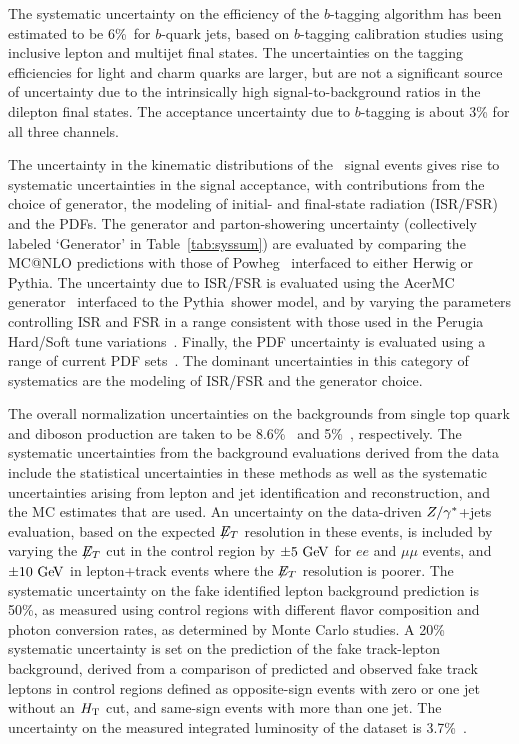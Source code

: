 The systematic uncertainty on the efficiency of the $b$-tagging algorithm has been estimated to be $6$\%\ for $b$-quark jets, based on $b$-tagging calibration studies using inclusive lepton and multijet final states.
The uncertainties on the tagging efficiencies for light and charm quarks are larger, but are not a significant source of uncertainty due to the
intrinsically high signal-to-background ratios in the dilepton final states.
The acceptance uncertainty due to $b$-tagging is about 3\% for all three channels.

The uncertainty in the kinematic distributions of the \ttbar\ signal events
gives rise to systematic uncertainties in
the signal acceptance, with contributions from the choice of generator, the modeling of initial- and final-state
radiation (ISR/FSR) and the PDFs.
The generator and parton-showering uncertainty (collectively labeled
`Generator' in Table~\ref{tab:syssum}) are evaluated by comparing the
{\sc MC@NLO} predictions  with those of
{\sc Powheg}~\cite{powheg,Frixione:2007vw,Alioli:2010xd} interfaced to
either {\sc Herwig} or {\sc Pythia}.
The uncertainty due to ISR/FSR is evaluated using the {\sc AcerMC} generator~\cite{Acer}
interfaced to the {\sc Pythia}\ shower model, and by varying the parameters controlling ISR
and FSR in a range consistent with those used in the Perugia Hard/Soft tune variations~\cite{Skands}.
Finally, the PDF uncertainty is evaluated using a range of
current PDF sets~\cite{Pumplin:2002vw}.
The dominant uncertainties in this category of systematics are the
modeling of ISR/FSR and the generator choice.

The overall normalization uncertainties on the backgrounds from
single top quark and diboson production are taken to be
8.6\%~\cite{PhysRevD.83.091503} and 5\%~\cite{Campbell:2010ff},
respectively.
%
The systematic uncertainties from the background evaluations derived from the data include the statistical uncertainties in these methods as well as the systematic uncertainties arising from lepton and jet identification and reconstruction, and the MC estimates that are used.
An uncertainty on the data-driven $Z/\gamma^{*}$+jets evaluation, based on the
expected $\not\!\!{E_{T}}$ resolution in these events, is included by varying the
$\not\!\!{E_{T}}$ cut in the control region by $\pm 5\GeV$ for $ee$ and $\mu\mu$
events, and $\pm 10\GeV$ in lepton+track events where the $\not\!\!{E_{T}}$
resolution is poorer.
The systematic uncertainty on the fake identified lepton background prediction is 50\%, as measured using control regions with different flavor composition and photon conversion rates, as determined by Monte Carlo studies. A 20\% systematic uncertainty is set on the prediction of the fake track-lepton background, derived from a comparison of predicted and observed fake track leptons in control
regions defined as opposite-sign events with zero or one jet without an $H_{\mathrm{T}}$ cut, and same-sign events with more than one jet.
%
The uncertainty on the measured integrated luminosity of the dataset is 3.7\%~\cite{ATLAS:2011cia}.

